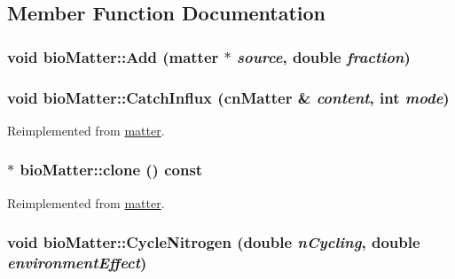 \subsection{Member Function Documentation}
\hypertarget{classbio_matter_ab203ee03cdbc31a5e462cd8b486636bd}{
\subsubsection[{Add}]{\setlength{\rightskip}{0pt plus 5cm}void bioMatter::Add ({\bf matter} $\ast$ {\em source}, \/  double {\em fraction})}}
\label{classbio_matter_ab203ee03cdbc31a5e462cd8b486636bd}
\hypertarget{classbio_matter_a5b83f540f697e51fcb235d252493675d}{
\subsubsection[{CatchInflux}]{\setlength{\rightskip}{0pt plus 5cm}void bioMatter::CatchInflux ({\bf cnMatter} \& {\em content}, \/  int {\em mode})}}
\label{classbio_matter_a5b83f540f697e51fcb235d252493675d}


Reimplemented from \hyperlink{classmatter_a5ad9b7b66c194958cdf58ec47024c0c9}{matter}.\hypertarget{classbio_matter_ab60f7bac01ff6e5de8c0be13d28c91b5}{
\subsubsection[{clone}]{ $\ast$ bioMatter::clone () const}}
\label{classbio_matter_ab60f7bac01ff6e5de8c0be13d28c91b5}


Reimplemented from \hyperlink{classmatter_afca594a86c75c8f40856bc5c8711266c}{matter}.\hypertarget{classbio_matter_a9257d95bfb49081c8dc1f2515f1a9d13}{
\subsubsection[{CycleNitrogen}]{\setlength{\rightskip}{0pt plus 5cm}void bioMatter::CycleNitrogen (double {\em nCycling}, \/  double {\em environmentEffect})}}
\label{classbio_matter_a9257d95bfb49081c8dc1f2515f1a9d13}


